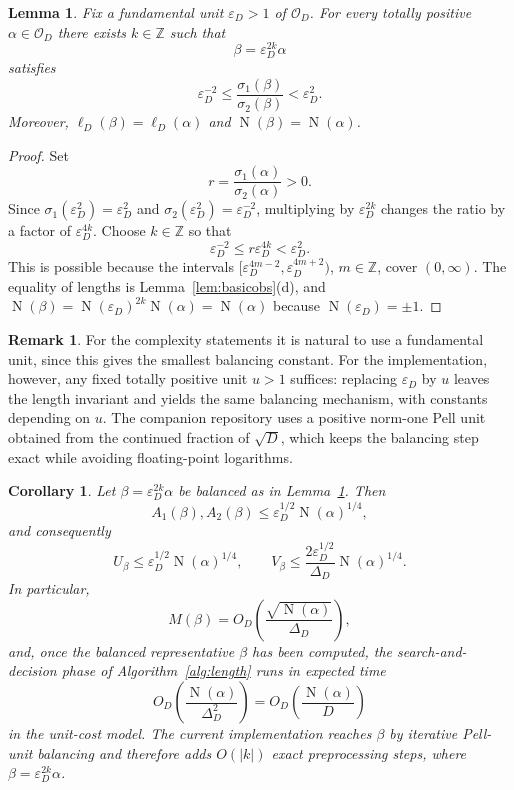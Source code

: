 \documentclass[manuscript,screen]{acmart}
\renewcommand{\le}{\leqslant}
\theoremstyle{plain}
\newtheorem{lemma}[theorem]{Lemma}
\newtheorem{corollary}[theorem]{Corollary}
\theoremstyle{definition}
\theoremstyle{nonitalicremark}
\newtheorem{remark}[theorem]{Remark}
\newcommand{\Z}{\mathbb{Z}}
\newcommand{\OD}{\mathcal{O}_D}
\newcommand{\len}{\ell}
\newcommand{\sig}{\sigma}
\newcommand{\epsD}{\varepsilon_D}
\newcommand{\Norm}{\operatorname{N}}
\begin{document}
\begin{lemma}\label{lem:balance}
Fix a fundamental unit $\epsD>1$ of $\OD$. For every totally positive
$\alpha\in\OD$ there exists $k\in\Z$ such that
\[
\beta = \epsD^{2k}\alpha
\]
satisfies
\[
\epsD^{-2} \le \frac{\sig_1(\beta)}{\sig_2(\beta)} < \epsD^{2}.
\]
Moreover, $\len_D(\beta)=\len_D(\alpha)$ and $\Norm(\beta)=\Norm(\alpha)$.
\end{lemma}

\begin{proof}
Set
\[
r = \frac{\sig_1(\alpha)}{\sig_2(\alpha)} > 0.
\]
Since $\sig_1(\epsD^2)=\epsD^2$ and $\sig_2(\epsD^2)=\epsD^{-2}$, multiplying by
$\epsD^{2k}$ changes the ratio by a factor of $\epsD^{4k}$. Choose $k\in\Z$ so that
\[
\epsD^{-2} \le r\epsD^{4k} < \epsD^2.
\]
This is possible because the intervals
$[\epsD^{4m-2},\epsD^{4m+2})$, $m\in\Z$, cover $(0,\infty)$.
The equality of lengths is Lemma~\ref{lem:basicobs}(d), and
$\Norm(\beta)=\Norm(\epsD)^{2k}\Norm(\alpha)=\Norm(\alpha)$ because
$\Norm(\epsD)=\pm 1$.
\end{proof}

\begin{remark}\label{rem:pell-balance}
For the complexity statements it is natural to use a fundamental unit, since this gives the
smallest balancing constant. For the implementation, however, any fixed totally positive unit
$u>1$ suffices: replacing $\epsD$ by $u$ leaves the length invariant and yields the same balancing
mechanism, with constants depending on $u$. The companion repository uses a positive norm-one Pell
unit obtained from the continued fraction of $\sqrt D$, which keeps the balancing step exact while
avoiding floating-point logarithms.
\end{remark}

\begin{corollary}\label{cor:balanced}
Let $\beta=\epsD^{2k}\alpha$ be balanced as in Lemma~\ref{lem:balance}. Then
\[
A_1(\beta), A_2(\beta) \le \epsD^{1/2}\Norm(\alpha)^{1/4},
\]
and consequently
\[
U_\beta \le \epsD^{1/2}\Norm(\alpha)^{1/4},
\qquad
V_\beta \le \frac{2\epsD^{1/2}}{\Delta_D}\Norm(\alpha)^{1/4}.
\]
In particular,
\[
M(\beta)=O_D\!\left(\frac{\sqrt{\Norm(\alpha)}}{\Delta_D}\right),
\]
and, once the balanced representative $\beta$ has been computed, the search-and-decision phase of
Algorithm~\ref{alg:length} runs in expected time
\[
O_D\!\left(\frac{\Norm(\alpha)}{\Delta_D^2}\right)=O_D\!\left(\frac{\Norm(\alpha)}{D}\right)
\]
in the unit-cost model. The current implementation reaches $\beta$ by iterative Pell-unit
balancing and therefore adds $O(|k|)$ exact preprocessing steps, where $\beta=\epsD^{2k}\alpha$.
\end{corollary}
\end{document}
